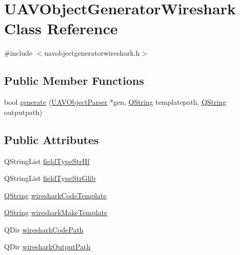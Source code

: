 \hypertarget{class_u_a_v_object_generator_wireshark}{\section{U\-A\-V\-Object\-Generator\-Wireshark Class Reference}
\label{class_u_a_v_object_generator_wireshark}
}


{\ttfamily \#include $<$uavobjectgeneratorwireshark.\-h$>$}

\subsection*{Public Member Functions}
\begin{DoxyCompactItemize}
\item 
bool \hyperlink{class_u_a_v_object_generator_wireshark_a8e10ac8ee410910e57967d05ae20ecfd}{generate} (\hyperlink{class_u_a_v_object_parser}{U\-A\-V\-Object\-Parser} $\ast$gen, \hyperlink{group___u_a_v_objects_plugin_gab9d252f49c333c94a72f97ce3105a32d}{Q\-String} templatepath, \hyperlink{group___u_a_v_objects_plugin_gab9d252f49c333c94a72f97ce3105a32d}{Q\-String} outputpath)
\end{DoxyCompactItemize}
\subsection*{Public Attributes}
\begin{DoxyCompactItemize}
\item 
Q\-String\-List \hyperlink{class_u_a_v_object_generator_wireshark_a7a2a353b4a9b437973989572c9b8751f}{field\-Type\-Str\-Hf}
\item 
Q\-String\-List \hyperlink{class_u_a_v_object_generator_wireshark_a9afefbf6da8bb2ee0d70fa65451b231d}{field\-Type\-Str\-Glib}
\item 
\hyperlink{group___u_a_v_objects_plugin_gab9d252f49c333c94a72f97ce3105a32d}{Q\-String} \hyperlink{class_u_a_v_object_generator_wireshark_aacc4df17c111504607837b77a78a87f6}{wireshark\-Code\-Template}
\item 
\hyperlink{group___u_a_v_objects_plugin_gab9d252f49c333c94a72f97ce3105a32d}{Q\-String} \hyperlink{class_u_a_v_object_generator_wireshark_afda0123ec94dd04a3273d5916f94c880}{wireshark\-Make\-Template}
\item 
Q\-Dir \hyperlink{class_u_a_v_object_generator_wireshark_a8a63f8ee4cd416f6690b936e28062ab8}{wireshark\-Code\-Path}
\item 
Q\-Dir \hyperlink{class_u_a_v_object_generator_wireshark_a7b0aa9382772edcb5f83a441c739660b}{wireshark\-Output\-Path}
\end{DoxyCompactItemize}


